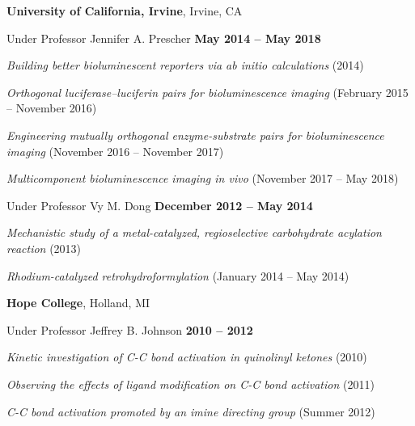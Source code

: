 \documentclass[10pt,letterpaper,courier]{article}
\newenvironment{outerlist}[1][\enskip\textbullet]%
        {\begin{enumerate}[#1]}{\end{enumerate}%
         \vspace{-.6\baselineskip}}
\newenvironment{innerlist}[1][\enskip\textbullet]%
        {\begin{compactenum}[#1]}{\end{compactenum}}
\begin{document}
{\textbf{University of California, Irvine}},
Irvine, CA
\begin{outerlist}
\item[] Under Professor Jennifer A. Prescher	\hfill 	\textbf{May 2014 -- May 2018}
	\begin{innerlist}
	\item \textit{Building better bioluminescent reporters via ab initio calculations} (2014)
	\item \textit{Orthogonal luciferase--luciferin pairs for bioluminescence imaging} (February 2015 -- November 2016)
	\item \textit{Engineering mutually orthogonal enzyme-substrate pairs for bioluminescence imaging} (November 2016 -- November 2017)
  \item \textit{Multicomponent bioluminescence imaging in vivo} (November 2017 -- May 2018)
	\end{innerlist}
\item[] Under Professor Vy M. Dong	\hfill 	\textbf{December 2012 -- May 2014}
	\begin{innerlist}
	\item \textit{Mechanistic study of a metal-catalyzed, regioselective carbohydrate acylation reaction} (2013)
	\item \textit{Rhodium-catalyzed retrohydroformylation} (January 2014 -- May 2014)
	\end{innerlist}
\end{outerlist}

\vspace{12pt}

{\textbf{Hope College}},
Holland, MI
\begin{outerlist}
\item[] Under Professor Jeffrey B. Johnson    \hfill  \textbf{2010 -- 2012}
	\begin{innerlist}
	\item \textit{Kinetic investigation of C-C bond activation in quinolinyl ketones} (2010)
	\item \textit{Observing the effects of ligand modification on C-C bond activation} (2011)
	\item \textit{C-C bond activation promoted by an imine directing group} (Summer 2012)
	\end{innerlist}
\end{outerlist}

\vspace{12pt}
\end{document}
